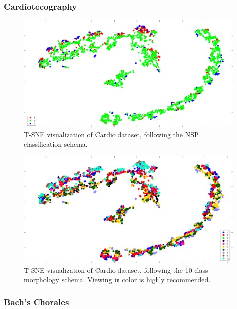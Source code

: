 \documentclass{beamer}
\begin{document}
\subsubsection{Cardiotocography}
\begin{frame}
	\begin{figure}
	\centering
	\includegraphics[width=0.9\linewidth]{figures/png/Cardio3TSNE}
	\caption[T-SNE visualization of Cardio dataset, NSP]{T-SNE visualization of Cardio dataset, following the NSP classification schema.}
	\label{fig:cardio3tsne}
\end{figure}

\end{frame}
\begin{frame}\begin{figure}
	\centering
	\includegraphics[width=0.9\linewidth]{figures/png/Cardio10TSNE}
	\caption[T-SNE visualization of Cardio dataset, morphology]{T-SNE visualization of Cardio dataset, following the 10-class morphology schema.  Viewing in color is highly recommended.}
	\label{fig:cardio10tsne}
\end{figure}
\end{frame}
\subsubsection{Bach's Chorales}
\end{document}
